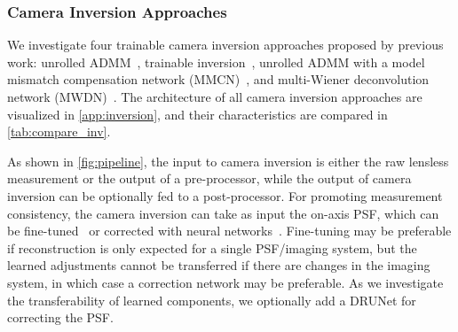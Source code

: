 \begin{table}[t!]
\renewcommand{\arraystretch}{1.3}
\caption{Comparison of trainable camera inversion approaches.}
\label{tab:compare_inv}
\centering
{}
\end{table}

\subsubsection{Camera Inversion Approaches}


\noindent We investigate four trainable camera inversion approaches proposed by previous work: unrolled ADMM~\cite{Monakhova:19}, trainable inversion~\cite{9239993}, unrolled ADMM with a model mismatch compensation network (MMCN)~\cite{9546648},
and multi-Wiener deconvolution network (MWDN)~\cite{Li:23}.
The architecture of all camera inversion approaches are visualized in \cref{app:inversion},
and their characteristics are compared in \cref{tab:compare_inv}.

As shown in \cref{fig:pipeline},
the input to camera inversion is either the raw lensless measurement or the output of a pre-processor,
while the output of camera inversion can be optionally fed to a post-processor.
For promoting measurement consistency,
the camera inversion can take as input the on-axis PSF,
which can be fine-tuned~\cite{9239993} or corrected with neural networks~\cite{Li:23}.
Fine-tuning may be preferable if reconstruction is only expected for a single PSF/imaging system,
but the learned adjustments cannot be transferred if there are changes in the imaging system,
in which case a correction network may be preferable.
As we investigate the transferability of learned components, 
we optionally add a DRUNet for correcting the PSF.

